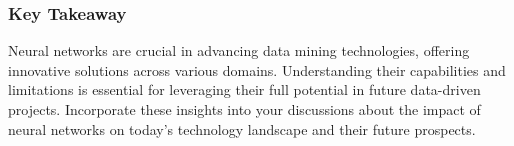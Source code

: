 \documentclass[aspectratio=169]{beamer}
\begin{document}
\begin{frame}[fragile]
    \frametitle{Key Takeaway}
    Neural networks are crucial in advancing data mining technologies, offering innovative solutions across various domains. Understanding their capabilities and limitations is essential for leveraging their full potential in future data-driven projects. Incorporate these insights into your discussions about the impact of neural networks on today's technology landscape and their future prospects.
\end{frame}
\end{document}
